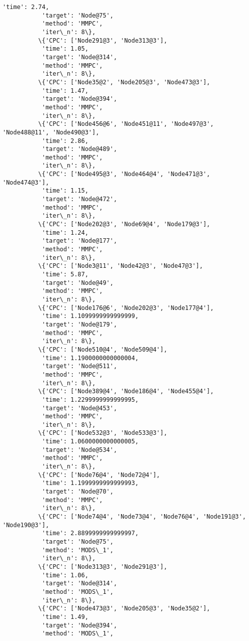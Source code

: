 \documentclass[11pt]{article}
\begin{document}
\begin{Verbatim}[commandchars=\\\{\}]
           'time': 2.74,
           'target': 'Node@75',
           'method': 'MMPC',
           'iter\_n': 8\},
          \{'CPC': ['Node291@3', 'Node313@3'],
           'time': 1.05,
           'target': 'Node@314',
           'method': 'MMPC',
           'iter\_n': 8\},
          \{'CPC': ['Node35@2', 'Node205@3', 'Node473@3'],
           'time': 1.47,
           'target': 'Node@394',
           'method': 'MMPC',
           'iter\_n': 8\},
          \{'CPC': ['Node456@6', 'Node451@11', 'Node497@3', 'Node488@11', 'Node490@3'],
           'time': 2.86,
           'target': 'Node@489',
           'method': 'MMPC',
           'iter\_n': 8\},
          \{'CPC': ['Node495@3', 'Node464@4', 'Node471@3', 'Node474@3'],
           'time': 1.15,
           'target': 'Node@472',
           'method': 'MMPC',
           'iter\_n': 8\},
          \{'CPC': ['Node202@3', 'Node69@4', 'Node179@3'],
           'time': 1.24,
           'target': 'Node@177',
           'method': 'MMPC',
           'iter\_n': 8\},
          \{'CPC': ['Node3@11', 'Node42@3', 'Node47@3'],
           'time': 5.87,
           'target': 'Node@49',
           'method': 'MMPC',
           'iter\_n': 8\},
          \{'CPC': ['Node176@6', 'Node202@3', 'Node177@4'],
           'time': 1.1099999999999999,
           'target': 'Node@179',
           'method': 'MMPC',
           'iter\_n': 8\},
          \{'CPC': ['Node510@4', 'Node509@4'],
           'time': 1.1900000000000004,
           'target': 'Node@511',
           'method': 'MMPC',
           'iter\_n': 8\},
          \{'CPC': ['Node389@4', 'Node186@4', 'Node455@4'],
           'time': 1.2299999999999995,
           'target': 'Node@453',
           'method': 'MMPC',
           'iter\_n': 8\},
          \{'CPC': ['Node532@3', 'Node533@3'],
           'time': 1.0600000000000005,
           'target': 'Node@534',
           'method': 'MMPC',
           'iter\_n': 8\},
          \{'CPC': ['Node76@4', 'Node72@4'],
           'time': 1.1999999999999993,
           'target': 'Node@70',
           'method': 'MMPC',
           'iter\_n': 8\},
          \{'CPC': ['Node74@4', 'Node73@4', 'Node76@4', 'Node191@3', 'Node190@3'],
           'time': 2.8899999999999997,
           'target': 'Node@75',
           'method': 'MODS\_1',
           'iter\_n': 8\},
          \{'CPC': ['Node313@3', 'Node291@3'],
           'time': 1.06,
           'target': 'Node@314',
           'method': 'MODS\_1',
           'iter\_n': 8\},
          \{'CPC': ['Node473@3', 'Node205@3', 'Node35@2'],
           'time': 1.49,
           'target': 'Node@394',
           'method': 'MODS\_1',

\end{Verbatim}
\end{document}
